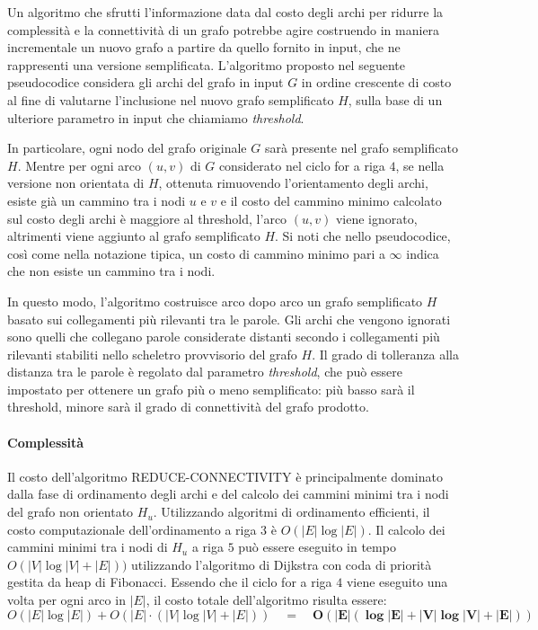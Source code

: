 
Un algoritmo che sfrutti l'informazione data dal costo degli archi per ridurre la complessità e la connettività
di un grafo potrebbe agire costruendo in maniera incrementale un nuovo grafo a partire da quello fornito in input,
che ne rappresenti una versione semplificata.
L'algoritmo proposto nel seguente pseudocodice considera gli archi del grafo in input $G$ in ordine crescente di
costo al fine di valutarne l'inclusione nel nuovo grafo semplificato $H$, sulla base di un ulteriore parametro in input
che chiamiamo \textit{threshold}.

In particolare, ogni nodo del grafo originale $G$ sarà presente nel grafo semplificato $H$. Mentre per ogni arco $(u, v)$
di $G$ considerato nel ciclo for a riga $4$, se nella versione non orientata di $H$, ottenuta rimuovendo l'orientamento
degli archi, esiste già un cammino tra i nodi $u$ e $v$ e il costo del cammino minimo calcolato sul costo degli archi
è maggiore al threshold, l'arco $(u, v)$ viene ignorato, altrimenti viene aggiunto al grafo semplificato $H$.
Si noti che nello pseudocodice, così come nella notazione tipica, un costo di cammino minimo pari a $\infty$ indica
che non esiste un cammino tra i nodi.



In questo modo, l'algoritmo costruisce arco dopo arco un grafo semplificato $H$ basato sui collegamenti più
rilevanti tra le parole.
Gli archi che vengono ignorati sono quelli che collegano parole considerate distanti secondo i collegamenti più
rilevanti stabiliti nello scheletro provvisorio del grafo $H$.
Il grado di tolleranza alla distanza tra le parole è regolato dal parametro \textit{threshold},
che può essere impostato per ottenere un grafo più o meno semplificato: più basso sarà il threshold, minore
sarà il grado di connettività del grafo prodotto.

\paragraph{Complessità}
Il costo dell'algoritmo REDUCE-CONNECTIVITY è principalmente dominato dalla fase di ordinamento degli archi
e del calcolo dei cammini minimi tra i nodi del grafo non orientato $H_u$.
Utilizzando algoritmi di ordinamento efficienti, il costo computazionale dell'ordinamento a riga $3$ è $O(|E| \log |E|)$.
Il calcolo dei cammini minimi tra i nodi di $H_u$ a riga $5$ può essere eseguito in tempo $O(|V| \log{|V|} + |E|))$
utilizzando l'algoritmo di Dijkstra con coda di priorità gestita da heap di Fibonacci.
Essendo che il ciclo for a riga $4$ viene eseguito una volta per ogni arco in $|E|$, il costo totale dell'algoritmo
risulta essere:
\begin{equation*}
      O(|E| \log |E|) + O(|E| \cdot (|V| \log{|V|} + |E|)) \quad = \quad
      \mathbf{O(|E| (\log |E| + |V| \log{|V|} + |E|))}
\end{equation*}

